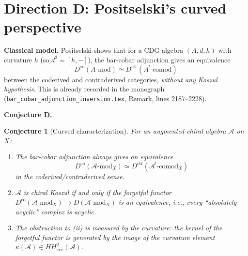 \documentclass[11pt]{article}
\newtheorem{conjecture}{Conjecture}
\theoremstyle{remark}
\newcommand{\cA}{\mathcal{A}}
\begin{document}
\section{Direction D: Positselski's curved perspective}

\textbf{Classical model.}  Positselski \cite{Positselski11} shows that for a CDG-algebra $(A, d, h)$ with curvature $h$ (so $d^2 = [h, -]$), the bar-cobar adjunction gives an equivalence
\[
D^{\mathrm{co}}(A\text{-mod}) \simeq D^{\mathrm{ctr}}(A^!\text{-comod})
\]
between the coderived and contraderived categories, \emph{without any Koszul hypothesis}.  This is already recorded in the monograph (\texttt{bar\_cobar\_adjunction\_inversion.tex}, Remark, lines 2187--2228).

\textbf{Conjecture D.}
\begin{conjecture}[Curved characterization]
For an augmented chiral algebra $\cA$ on $X$:
\begin{enumerate}[label=(\roman*)]
\item The bar-cobar adjunction \emph{always} gives an equivalence
\[
D^{\mathrm{co}}(\cA\text{-mod}_X) \simeq D^{\mathrm{ctr}}(\cA^!\text{-comod}_X)
\]
in the coderived/contraderived sense.
\item $\cA$ is chiral Koszul if and only if the forgetful functor $D^{\mathrm{co}}(\cA\text{-mod}_X) \to D(\cA\text{-mod}_X)$ is an equivalence, i.e., every ``absolutely acyclic'' complex is acyclic.
\item The obstruction to (ii) is measured by the curvature: the kernel of the forgetful functor is generated by the image of the curvature element $\kappa(\cA) \in HH^2_{\mathrm{cyc}}(\cA)$.
\end{enumerate}
\end{conjecture}
\end{document}

